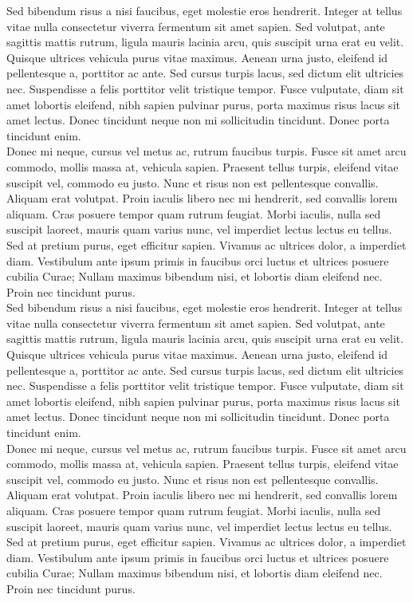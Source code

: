 Sed bibendum risus a nisi faucibus, eget molestie eros hendrerit. Integer at tellus vitae nulla consectetur viverra fermentum sit amet sapien. Sed volutpat, ante sagittis mattis rutrum, ligula mauris lacinia arcu, quis suscipit urna erat eu velit. Quisque ultrices vehicula purus vitae maximus. Aenean urna justo, eleifend id pellentesque a, porttitor ac ante. Sed cursus turpis lacus, sed dictum elit ultricies nec. Suspendisse a felis porttitor velit tristique tempor. Fusce vulputate, diam sit amet lobortis eleifend, nibh sapien pulvinar purus, porta maximus risus lacus sit amet lectus. Donec tincidunt neque non mi sollicitudin tincidunt. Donec porta tincidunt enim.
\\

Donec mi neque, cursus vel metus ac, rutrum faucibus turpis. Fusce sit amet arcu commodo, mollis massa at, vehicula sapien. Praesent tellus turpis, eleifend vitae suscipit vel, commodo eu justo. Nunc et risus non est pellentesque convallis. Aliquam erat volutpat. Proin iaculis libero nec mi hendrerit, sed convallis lorem aliquam. Cras posuere tempor quam rutrum feugiat. Morbi iaculis, nulla sed suscipit laoreet, mauris quam varius nunc, vel imperdiet lectus lectus eu tellus. Sed at pretium purus, eget efficitur sapien. Vivamus ac ultrices dolor, a imperdiet diam. Vestibulum ante ipsum primis in faucibus orci luctus et ultrices posuere cubilia Curae; Nullam maximus bibendum nisi, et lobortis diam eleifend nec. Proin nec tincidunt purus. 
\\


Sed bibendum risus a nisi faucibus, eget molestie eros hendrerit. Integer at tellus vitae nulla consectetur viverra fermentum sit amet sapien. Sed volutpat, ante sagittis mattis rutrum, ligula mauris lacinia arcu, quis suscipit urna erat eu velit. Quisque ultrices vehicula purus vitae maximus. Aenean urna justo, eleifend id pellentesque a, porttitor ac ante. Sed cursus turpis lacus, sed dictum elit ultricies nec. Suspendisse a felis porttitor velit tristique tempor. Fusce vulputate, diam sit amet lobortis eleifend, nibh sapien pulvinar purus, porta maximus risus lacus sit amet lectus. Donec tincidunt neque non mi sollicitudin tincidunt. Donec porta tincidunt enim.
\\

Donec mi neque, cursus vel metus ac, rutrum faucibus turpis. Fusce sit amet arcu commodo, mollis massa at, vehicula sapien. Praesent tellus turpis, eleifend vitae suscipit vel, commodo eu justo. Nunc et risus non est pellentesque convallis. Aliquam erat volutpat. Proin iaculis libero nec mi hendrerit, sed convallis lorem aliquam. Cras posuere tempor quam rutrum feugiat. Morbi iaculis, nulla sed suscipit laoreet, mauris quam varius nunc, vel imperdiet lectus lectus eu tellus. Sed at pretium purus, eget efficitur sapien. Vivamus ac ultrices dolor, a imperdiet diam. Vestibulum ante ipsum primis in faucibus orci luctus et ultrices posuere cubilia Curae; Nullam maximus bibendum nisi, et lobortis diam eleifend nec. Proin nec tincidunt purus. 
\\

